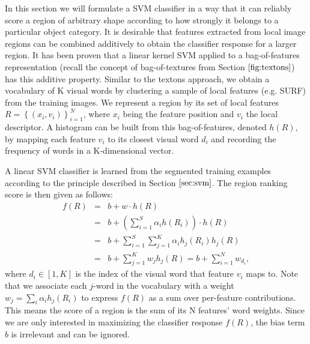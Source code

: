 \documentclass{SMBV12}
\begin{document}
In this section we will formulate a SVM classifier in a way that it can reliably score a region of arbitrary shape according to how strongly it belongs to a particular object category. It is desirable that features extracted from local image regions can be combined additively to obtain the classifier response for a larger region. It has been proven \cite{lampert2008beyond} that a linear kernel SVM applied to a bag-of-features representation (recall the concept of bag-of-textures from Section $\ref{fig:textons}$) has this additive property. Similar to the textons approach, we obtain a vocabulary of K visual words by clustering a sample of local features (e.g. SURF) from the training images. We represent a region by its set of local features $R = \left\lbrace (x_i, v_i) \right\rbrace _{i=1} ^ N$, where $x_i$ being the feature position and $v_i$ the local descriptor. A histogram can be built from this bag-of-features, denoted $h(R)$, by mapping each feature $v_i$ to its closest visual word $d_i$ and recording the frequency of words in a K-dimensional vector.

A linear SVM classifier is learned from the segmented training examples according to the principle described in Section $\ref{sec:svm}$. The region ranking score is then given as follows:
\begin{equation}
\label{eq:svm_classifier}
\begin{array}{lcl}
f(R) & = & b + w \cdot h(R)\\
	 & = & b + (\sum\limits_{i = 1}^{S}\alpha_ih(R_i)) \cdot h(R)\\
     & = & b + \sum\limits_{i = 1}^{S}\sum\limits_{j = 1}^{K} \alpha_ih_j(R_i)h_j(R)\\
     & = & b + \sum\limits_{j = 1}^{K} w_jh_j(R) = b + \sum\limits_{i = 1}^{N} w_{d_i},
\end{array}
\end{equation}
where $d_i \in [1, K]$ is the index of the visual word that feature $v_i$ maps to. Note that we associate each $j$-word in the vocabulary with a weight $w_j = \sum_i \alpha_i h_j(R_i)$ to express $f(R)$ as a sum over per-feature contributions. This means the score of a region is the sum of its N features' word weights. Since we are only interested in maximizing the classifier response $f(R)$, the bias term $b$ is irrelevant and can be ignored.
\end{document}
